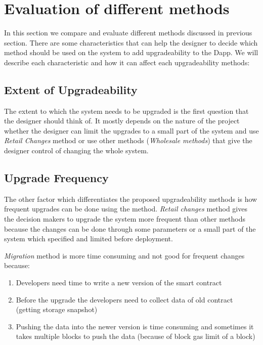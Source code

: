  \section{Evaluation of different methods}
 In this section we compare and evaluate different methods discussed in previous section. There are some characteristics that can help the designer to decide which method should be used on the system to add upgradeability to the Dapp. We will describe each characteristic and how it can affect each upgradeability methods:

 \subsection{Extent of Upgradeability}

 The extent to which the system needs to be upgraded is the first question that the designer should think of. It mostly depends on the nature of the project whether the designer can limit the upgrades to a small part of the system and use \textit{Retail Changes} method or use other methods (\ie \textit{Wholesale methods}) that give the designer control of changing the whole system. 

 \subsection{Upgrade Frequency} 

 The other factor which differentiates the proposed upgradeability methods is how frequent upgrades can be done using the method. \textit{Retail changes} method gives the decision makers to upgrade the system more frequent than other methods because the changes can be done through some parameters or a small part of the system which specified and limited before deployment. 
 
\textit{Migration} method is more time consuming and not good for frequent changes because:
 \begin{enumerate}
  \item Developers need time to write a new version of the smart contract  
  \item Before the upgrade the developers need to collect data of old contract (\eg getting storage snapshot)
  \item Pushing the data into the newer version is time consuming and sometimes it takes multiple blocks to push the data (because of block gas limit of a block)
 \end{enumerate}


